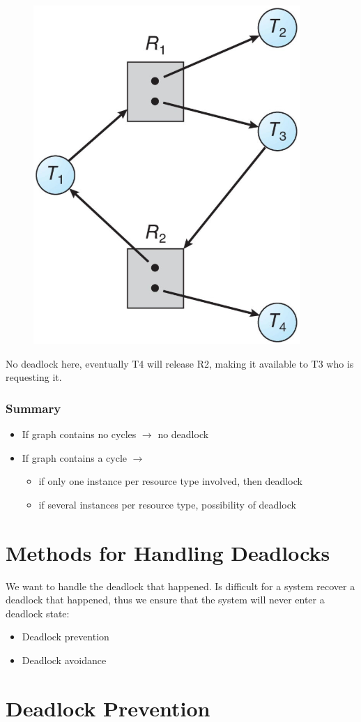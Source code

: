 \begin{figure}[htbp]
    \centering
    \includegraphics[width=0.27\linewidth]{img/g_no_dead.png}
\end{figure}
No deadlock here, eventually T4 will release R2, making it available to T3 who is requesting it.

\subsubsection{Summary}

\begin{itemize}
    \item If graph contains no cycles $\to$ no deadlock
    \item If graph contains a cycle $\to$
    \begin{itemize}
        \item[] if only one instance per resource type involved, then deadlock
        \item[] if several instances per resource type, possibility of deadlock
    \end{itemize}
\end{itemize}

\section{Methods for Handling Deadlocks}

We want to handle the deadlock that happened. Is difficult for a system recover a deadlock that happened, thus we ensure that the system will never enter a deadlock state:

\begin{itemize}
    \item Deadlock prevention
    \item Deadlock avoidance
\end{itemize}

\section{Deadlock Prevention}

